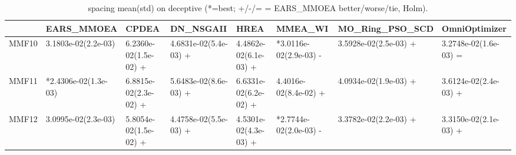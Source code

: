 \begin{table}[t]
\centering
\caption{spacing mean(std) on deceptive (*=best; +/-/= = EARS_MMOEA better/worse/tie, Holm).}
\label{tab:deceptive_spacing}
\begin{tabular}{llllllll}
\toprule
 & EARS\_MMOEA & CPDEA & DN\_NSGAII & HREA & MMEA\_WI & MO\_Ring\_PSO\_SCD & OmniOptimizer \\
\midrule
MMF10 & 3.1803e-02(2.2e-03) & 6.2360e-02(1.5e-02) + & 4.6831e-02(5.4e-03) + & 4.4862e-02(6.1e-03) + & *3.0116e-02(2.9e-03) - & 3.5928e-02(2.5e-03) + & 3.2748e-02(1.6e-03) = \\
MMF11 & *2.4306e-02(1.3e-03) & 6.8815e-02(2.3e-02) + & 5.6483e-02(8.6e-03) + & 6.6331e-02(6.2e-02) + & 4.4016e-02(8.4e-02) + & 4.0934e-02(1.9e-03) + & 3.6124e-02(2.4e-03) + \\
MMF12 & 3.0995e-02(2.3e-03) & 5.8054e-02(1.5e-02) + & 4.4758e-02(5.5e-03) + & 4.5301e-02(4.3e-03) + & *2.7744e-02(2.0e-03) - & 3.3782e-02(2.2e-03) + & 3.3150e-02(2.1e-03) + \\
\bottomrule
\end{tabular}
\end{table}
